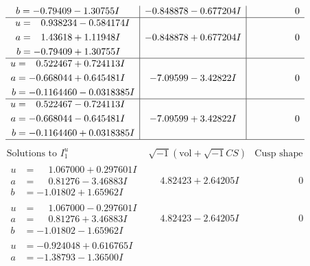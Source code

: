 \documentclass[1p]{elsarticle_modified}
\theoremstyle{definition}
\newcommand{\I}{\sqrt{-1}}
\begin{document}
$$\begin{array}{c|c|c}
\begin{aligned}
b &= -0.79409 - 1.30755 I\end{aligned}
 & -0.848878 - 0.677204 I & \phantom{-0.000000 } 0 \\ \hline\begin{aligned}
u &= \phantom{-}0.938234 - 0.584174 I \\
a &= \phantom{-}1.43618 + 1.11948 I \\
b &= -0.79409 + 1.30755 I\end{aligned}
 & -0.848878 + 0.677204 I & \phantom{-0.000000 } 0 \\ \hline\begin{aligned}
u &= \phantom{-}0.522467 + 0.724113 I \\
a &= -0.668044 + 0.645481 I \\
b &= -0.1164460 - 0.0318385 I\end{aligned}
 & -7.09599 - 3.42822 I & \phantom{-0.000000 } 0 \\ \hline\begin{aligned}
u &= \phantom{-}0.522467 - 0.724113 I \\
a &= -0.668044 - 0.645481 I \\
b &= -0.1164460 + 0.0318385 I\end{aligned}
 & -7.09599 + 3.42822 I & \phantom{-0.000000 } 0\\
 \hline 
 \end{array}$$\newpage$$\begin{array}{c|c|c}  
\text{Solutions to }I^u_{1}& \I (\text{vol} + \sqrt{-1}CS) & \text{Cusp shape}\\
 \hline 
\begin{aligned}
u &= \phantom{-}1.067000 + 0.297601 I \\
a &= \phantom{-}0.81276 - 3.46883 I \\
b &= -1.01802 + 1.65962 I\end{aligned}
 & \phantom{-}4.82423 + 2.64205 I & \phantom{-0.000000 } 0 \\ \hline\begin{aligned}
u &= \phantom{-}1.067000 - 0.297601 I \\
a &= \phantom{-}0.81276 + 3.46883 I \\
b &= -1.01802 - 1.65962 I\end{aligned}
 & \phantom{-}4.82423 - 2.64205 I & \phantom{-0.000000 } 0 \\ \hline\begin{aligned}
u &= -0.924048 + 0.616765 I \\
a &= -1.38793 - 1.36500 I \\

\end{aligned}
\end{array}$$
\end{document}
